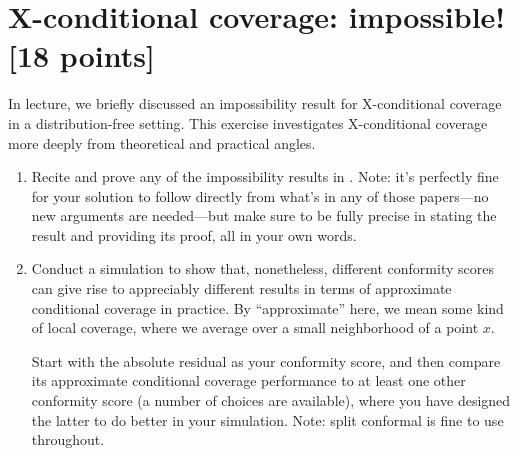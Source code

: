 \documentclass{article}
\begin{document}
\section{X-conditional coverage: impossible! [18 points]}

In lecture, we briefly discussed an impossibility result for X-conditional
coverage in a distribution-free setting. This exercise investigates
X-conditional coverage more deeply from theoretical and practical angles. 

\begin{enumerate}[label=(\alph*)]
\item Recite and prove any of the impossibility results in
  \citet{lei2014distribution, vovk2012conditional, barber2021limits}. Note: it's
  perfectly fine for your solution to follow directly from what's in any of
  those papers---no new arguments are needed---but make sure to be fully precise
  in stating the result and providing its proof, all in your own words.  
  \marginpar{\small [8 pts]}

\item Conduct a simulation to show that, nonetheless, different conformity
  scores can give rise to appreciably different results in terms of approximate
  conditional coverage in practice. By ``approximate'' here, we mean some
  kind of local coverage, where we average over a small neighborhood of a point 
  $x$.    

  Start with the absolute residual as your conformity score, and then compare
  its approximate conditional coverage performance to at least one other
  conformity score (a number of choices are available), where you have designed
  the latter to do better in your simulation. Note: split conformal is fine to
  use throughout.  
  \marginpar{\small [10 pts]}
\end{enumerate}





\end{document}
